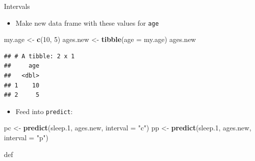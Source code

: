 \documentclass[ignorenonframetext,]{beamer}
\newenvironment{Shaded}{\begin{snugshade}}{\end{snugshade}}
\newcommand{\DataTypeTok}[1]{\textcolor[rgb]{0.13,0.29,0.53}{#1}}
\newcommand{\DecValTok}[1]{\textcolor[rgb]{0.00,0.00,0.81}{#1}}
\newcommand{\FloatTok}[1]{\textcolor[rgb]{0.00,0.00,0.81}{#1}}
\newcommand{\KeywordTok}[1]{\textcolor[rgb]{0.13,0.29,0.53}{\textbf{#1}}}
\newcommand{\NormalTok}[1]{#1}
\newcommand{\StringTok}[1]{\textcolor[rgb]{0.31,0.60,0.02}{#1}}
\providecommand{\tightlist}{%
  \setlength{\itemsep}{0pt}\setlength{\parskip}{0pt}}
\begin{document}
\begin{frame}[fragile]{Intervals}
\protect\hypertarget{intervals}{}

\begin{itemize}
\tightlist
\item
  Make new data frame with these values for \texttt{age}
\end{itemize}

\begin{Shaded}
\begin{Highlighting}[]
\NormalTok{my.age <-}\StringTok{ }\KeywordTok{c}\NormalTok{(}\DecValTok{10}\NormalTok{, }\DecValTok{5}\NormalTok{)}
\NormalTok{ages.new <-}\StringTok{ }\KeywordTok{tibble}\NormalTok{(}\DataTypeTok{age =}\NormalTok{ my.age)}
\NormalTok{ages.new}
\end{Highlighting}
\end{Shaded}

\begin{verbatim}
## # A tibble: 2 x 1
##     age
##   <dbl>
## 1    10
## 2     5
\end{verbatim}

\begin{itemize}
\tightlist
\item
  Feed into \texttt{predict}:
\end{itemize}

\begin{Shaded}
\begin{Highlighting}[]
\NormalTok{pc <-}\StringTok{ }\KeywordTok{predict}\NormalTok{(sleep}\FloatTok{.1}\NormalTok{, ages.new, }\DataTypeTok{interval =} \StringTok{"c"}\NormalTok{)}
\NormalTok{pp <-}\StringTok{ }\KeywordTok{predict}\NormalTok{(sleep}\FloatTok{.1}\NormalTok{, ages.new, }\DataTypeTok{interval =} \StringTok{"p"}\NormalTok{)}
\end{Highlighting}
\end{Shaded}

def

\end{frame}
\end{document}
